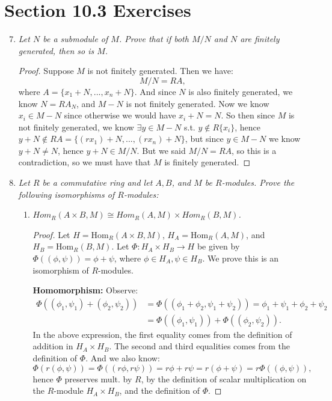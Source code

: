\documentclass[10pt,oneside,reqno]{amsart}
\theoremstyle{plain}
\theoremstyle{definition}
\theoremstyle{remark}
\begin{document}
\section*{Section 10.3 Exercises}

\begin{enumerate}[label=\arabic*.]
\setcounter{enumi}{6}
\item \textit{Let $N$ be a submodule of $M$. Prove that if both $M/N$ and $N$ are finitely generated, then so is $M$. }
\begin{proof}
Suppose $M$ is not finitely generated. Then we have:
$$
M/N = RA,
$$
where $A = \{x_1 + N,...,x_n + N\}$. And since $N$ is also finitely generated, we know $N = RA_N$, and $M -N$ is not finitely generated. 
Now we know $x_i \in M - N$ since otherwise we would have $x_i + N = N$. So then since $M$ is not finitely generated, we know $\exists y \in M - N$ s.t. $y \notin R\{x_i\}$, hence $y + N \notin RA = \{(rx_1) + N,...,(rx_n)+ N\}$, but since $y \in M - N$ we know $y + N \neq N$, hence $y + N \in M/N$. But we said $M/N = RA$, so this is a contradiction, so we must have that $M$ is finitely generated. 
\end{proof}

\setcounter{enumi}{11}
\item \textit{Let $R$ be a commutative ring and let $A,B$, and $M$ be $R$-modules. Prove the following isomorphisms of $R$-modules: }
\begin{enumerate}
\item \textit{$Hom_R(A\times B,M) \cong Hom_R(A,M) \times Hom_R(B,M)$.}
\begin{proof}
Let $H = \text{Hom}_R(A\times B,M)$, $H_A = \text{Hom}_R(A,M)$, and $H_B = \text{Hom}_R(B,M)$. Let $\Phi: H_A \times H_B\to H$ be given by $\Phi((\phi,\psi)) = \phi + \psi$, where $\phi \in H_A,\psi \in H_B$. We prove this is an isomorphism of $R$-modules. 

\textbf{Homomorphism: }Observe: 
\begin{equation}
\begin{aligned}
\Phi((\phi_1,\psi_1) + (\phi_2,\psi_2)) &= \Phi((\phi_1 + \phi_2,\psi_1 + \psi_2)) = \phi_1 + \psi_1 + \phi_2 + \psi_2\\ &= \Phi((\phi_1,\psi_1)) + \Phi((\phi_2,\psi_2)).
\end{aligned}
\end{equation}
In the above expression, the first equality comes from the definition of addition in $H_A \times H_B$. The second and third equalities comes from the definition of $\Phi$. And we also know: 
$$
\Phi(r(\phi,\psi)) = \Phi((r\phi,r\psi)) = r\phi + r\psi = r(\phi + \psi) = r\Phi((\phi,\psi)),
$$
hence $\Phi$ preserves mult. by $R$, by the definition of scalar multiplication on the $R$-module $H_A \times H_B$, and the definition of $\Phi$. 


\end{proof}
\end{enumerate}
\end{enumerate}
\end{document}
